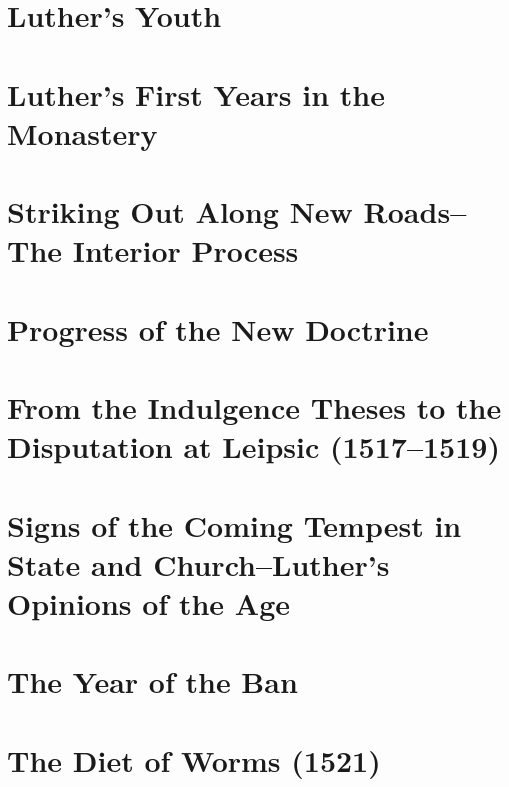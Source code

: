 \chapter{Luther’s Youth}




\chapter{Luther's First Years in the Monastery}




\chapter{Striking Out Along New Roads--The Interior Process}



\chapter{Progress of the New Doctrine}





\chapter{From the Indulgence Theses to the Disputation at Leipsic (1517--1519)}




\chapter{Signs of the Coming Tempest in State and Church--Luther’s Opinions of the Age}




\chapter{The Year of the Ban}





\chapter{The Diet of Worms (1521)}


